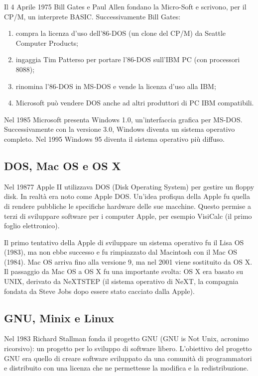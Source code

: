 Il 4 Aprile 1975 Bill Gates e Paul Allen fondano la Micro-Soft e scrivono,
per il CP/M, un interprete BASIC. Successivamente Bill Gates:

\begin{enumerate}
    \item compra la licenza d'uso dell'86-DOS (un clone del CP/M) da Seattle Computer Products;
    \item ingaggia Tim Patterso per portare l'86-DOS sull'IBM PC (con processori 8088);
    \item rinomina l'86-DOS in MS-DOS e vende la licenza d'uso alla IBM;
    \item Microsoft può vendere DOS anche ad altri produttori di PC IBM compatibili.
\end{enumerate}

Nel 1985 Microsoft presenta Windows 1.0, un'interfaccia grafica per MS-DOS.
Successivamente con la versione 3.0, Windows diventa un sistema operativo
completo. Nel 1995 Windows 95 diventa il sistema operativo più diffuso.


\subsection{DOS, Mac OS e OS X}

Nel 19877 Apple II utilizzava DOS (Disk Operating System) per gestire
un floppy disk. In realtà era noto come Apple DOS.
Un'idea profiqua della Apple fu quella di rendere pubbliche le specifiche
hardware delle sue macchine. Questo permise a terzi di sviluppare software
per i computer Apple, per esempio VisiCalc (il primo foglio elettronico).

Il primo tentativo della Apple di sviluppare un sistema operativo fu il Lisa OS
(1983), ma non ebbe successo e fu rimpiazzato dal Macintosh con il Mac OS (1984).
Mac OS arriva fino alla versione 9, ma nel 2001 viene sostituito da OS X.
Il passaggio da Mac OS a OS X fu una importante svolta: OS X era basato su UNIX,
derivato da NeXTSTEP (il sistema operativo di NeXT, la compagnia fondata da Steve Jobs
dopo essere stato cacciato dalla Apple).

\subsection{GNU, Minix e Linux}

Nel 1983 Richard Stallman fonda il progetto GNU (GNU is Not Unix, acronimo ricorsivo):
un progetto per lo sviluppo di software libero. L'obiettivo del progetto GNU era
quello di creare software sviluppato da una comunità di programmatori e distribuito
con una licenza che ne permettesse la modifica e la redistribuzione. 

